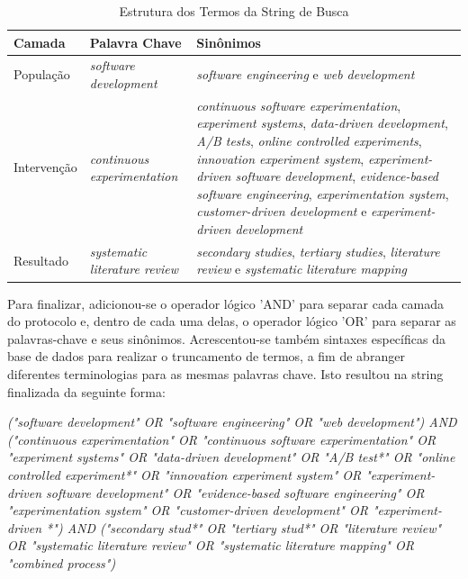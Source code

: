 \begin{table}[ht]
\caption{Estrutura dos Termos da String de Busca}
    \begin{tabular}{|p{2cm}|p{3cm}|p{9cm}|}
        \hline
        \textbf{Camada} & \textbf{Palavra Chave} & \textbf{Sinônimos} \\ \hline
        População & \textit{software development} & \textit{software engineering} 
         e \textit{web development} \\ \hline
        Intervenção & \textit{continuous experimentation} & \textit{continuous software experimentation}, \textit{experiment systems}, \textit{data-driven development}, \textit{A/B tests}, \textit{online controlled experiments}, \textit{innovation experiment system}, \textit{experiment-driven software development}, \textit{evidence-based software engineering}, \textit{experimentation system}, \textit{customer-driven development} e \textit{experiment-driven development} \\ \hline
        Resultado & \textit{systematic literature review} & \textit{secondary studies}, \textit{tertiary studies}, \textit{literature review} e \textit{systematic literature mapping} \\ \hline
    \end{tabular}

    \begin{center}
        
    \end{center}

\label{tab:string-busca}
\end{table}

Para finalizar, adicionou-se o operador lógico 'AND' para separar cada camada do protocolo e, dentro de cada uma delas, o operador lógico 'OR' para separar as palavras-chave e seus sinônimos. Acrescentou-se também sintaxes específicas da base de dados para realizar o truncamento de termos, a fim de abranger diferentes terminologias para as mesmas palavras chave. Isto resultou na string finalizada da seguinte forma:

\textit{("software development" OR "software engineering" OR "web development") 
AND 
("continuous experimentation" OR "continuous software experimentation" OR "experiment systems" OR "data-driven development" OR "A/B test*" OR "online controlled experiment*" OR "innovation experiment system" OR "experiment-driven software development" OR "evidence-based software engineering" OR "experimentation system" OR "customer-driven development" OR "experiment-driven *") 
AND 
("secondary stud*" OR "tertiary stud*" OR "literature review" OR "systematic literature review" OR "systematic literature mapping" OR "combined process") 
}